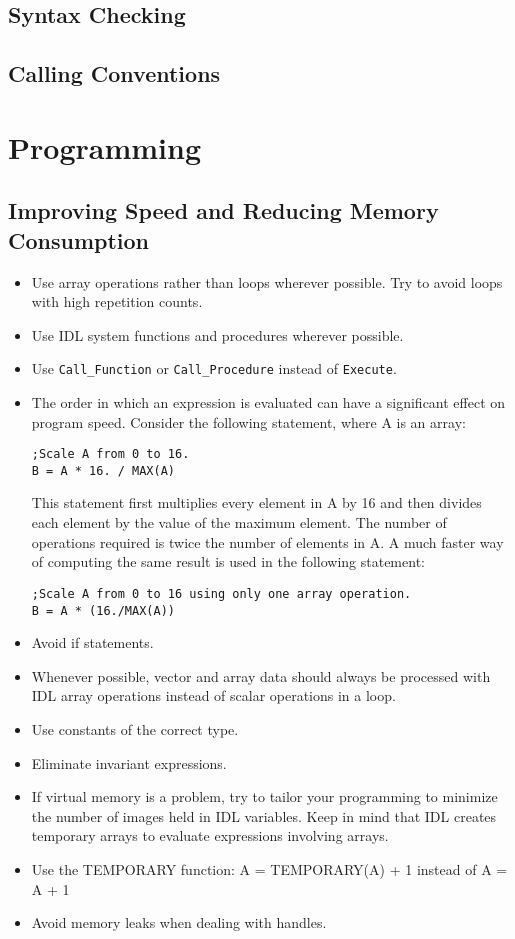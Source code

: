 \documentclass[12pt]{article}
\begin{document}
\subsection{Syntax Checking}
\subsection{Calling Conventions}

\section{Programming}


\subsection{Improving Speed and Reducing Memory Consumption}

\begin{itemize}
\item Use array operations rather than loops wherever possible. Try to avoid loops with high repetition counts.
\item Use IDL system functions and procedures wherever possible.
\item Use \texttt{Call\_Function} or \texttt{Call\_Procedure} instead of \texttt{Execute}.
\item The order in which an expression is evaluated can have a significant effect on program speed. Consider the following statement, where A is an array:
\begin{verbatim}
;Scale A from 0 to 16.
B = A * 16. / MAX(A)
\end{verbatim}
This statement first multiplies every element in A by 16 and then divides each element by the value of the maximum element. The number of operations required is twice the number of elements in A. A much faster way of computing the same result is used in the following statement:
\begin{verbatim}
;Scale A from 0 to 16 using only one array operation.
B = A * (16./MAX(A))
\end{verbatim}
\item Avoid if statements.
\item Whenever possible, vector and array data should always be processed with IDL array operations instead of scalar operations in a loop. 
\item Use constants of the correct type.
\item Eliminate invariant expressions.
\item If virtual memory is a problem, try to tailor your programming to minimize the number of images held in IDL variables. Keep in mind that IDL creates temporary arrays to evaluate expressions involving arrays.  
\item Use the TEMPORARY function: A = TEMPORARY(A) + 1 instead of A = A + 1
\item Avoid memory leaks when dealing with handles.
\end{itemize}
\end{document}
